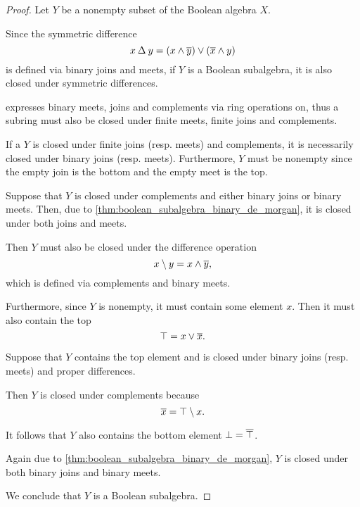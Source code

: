 \begin{proof}
  Let \( Y \) be a nonempty subset of the Boolean algebra \( X \).

   Since the symmetric difference
  \begin{equation*}
    x \symdiff y = (x \wedge \oline y) \vee (\oline x \wedge y)
  \end{equation*}
  is defined via binary joins and meets, if \( Y \) is a Boolean subalgebra, it is also closed under symmetric differences.

    expresses binary meets, joins and complements via ring operations on, thus a subring must also be closed under finite meets, finite joins and complements.

   If a \( Y \) is closed under finite joins (resp. meets) and complements, it is necessarily closed under binary joins (resp. meets). Furthermore, \( Y \) must be nonempty since the empty join is the bottom and the empty meet is the top.

   Suppose that \( Y \) is closed under complements and either binary joins or binary meets. Then, due to \cref{thm:boolean_subalgebra_binary_de_morgan}, it is closed under both joins and meets.

  Then \( Y \) must also be closed under the difference operation
  \begin{equation*}
    x \setminus y = x \wedge \oline y,
  \end{equation*}
  which is defined via complements and binary meets.

  Furthermore, since \( Y \) is nonempty, it must contain some element \( x \). Then it must also contain the top
  \begin{equation*}
    \top = x \vee \oline x.
  \end{equation*}

   Suppose that \( Y \) contains the top element and is closed under binary joins (resp. meets) and proper differences.

  Then \( Y \) is closed under complements because
  \begin{equation*}
    \oline x = \top \setminus x.
  \end{equation*}

  It follows that \( Y \) also contains the bottom element \( \bot = \oline \top \).

  Again due to \cref{thm:boolean_subalgebra_binary_de_morgan}, \( Y \) is closed under both binary joins and binary meets.

  We conclude that \( Y \) is a Boolean subalgebra.
\end{proof}

